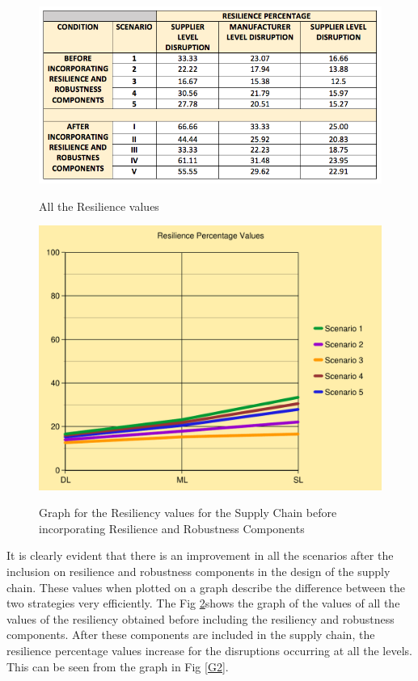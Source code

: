 \begin{figure}[H]
  \centering
  \includegraphics[width=6.5in]{figures/pdf/ResilienceValues.png}\\
  \caption{All the Resilience values}\label{RESV}
\end{figure}  



\begin{figure}[H]
  \centering
  \includegraphics[width=5.5in]{figures/pdf/Before(Graph).pdf}\\
  \caption{Graph for the Resiliency values for the Supply Chain before incorporating Resilience and Robustness Components}\label{G1}
\end{figure}  

It is clearly evident that there is an improvement in all the scenarios after the inclusion on resilience and robustness components in the design of the supply chain. These values when plotted on a graph describe the difference between the two strategies very efficiently. The Fig \ref{G1}shows the graph of the values of all the values of the resiliency obtained before including the resiliency and robustness components. After these components are included in the supply chain, the resilience percentage values increase for the disruptions occurring at all the levels. This can be seen from the graph in Fig \ref{G2}.

